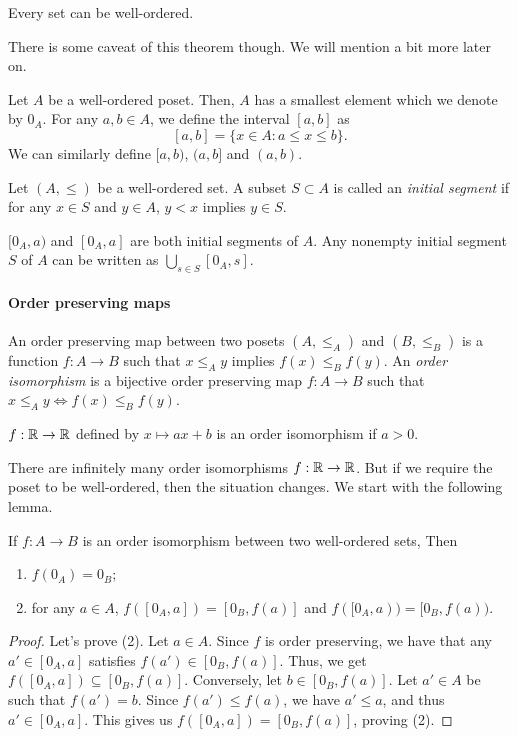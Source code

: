 \begin{theorem}
  Every set can be well-ordered.
\end{theorem}

There is some caveat of this theorem though. We will mention a bit more later on.

\begin{definition}
  Let $A$ be a well-ordered poset. Then, $A$ has a smallest element which we denote by $0_A$. For any $a,b\in A$, we define the interval $[a,b]$ as
  \[
  [a,b] = \{x\in A: a\leq x\leq b\}.
  \]
  We can similarly define $[a,b)$, $(a,b]$ and $(a,b)$.
\end{definition}

\begin{definition}
  Let $(A,\leq)$ be a well-ordered set. A subset $S\subset A$ is called an \emph{initial segment} if for any $x\in S$ and $y\in A$, $y<x$ implies $y\in S$. 
\end{definition}

\begin{example}
  $[0_A,a)$ and $[0_A,a]$ are both initial segments of $A$. Any nonempty initial segment $S$ of $A$ can be written as $\bigcup_{s\in S}[0_A,s]$.
\end{example}


\paragraph{Order preserving maps}
An order preserving map between two posets $(A,\le_A)$ and $(B,\le_B)$ is a function $f\colon A\to B$ such that $x\le_A y$ implies $f(x)\le_B f(y)$.  An \emph{order isomorphism} is a bijective order preserving map $f:A\to B$ such that $x\le_A y \iff f(x)\le_B f(y)$.

\begin{example}
  $f:\mathbb{R}\to \mathbb{R}$ defined by $x\mapsto ax+b$ is an order isomorphism if $a>0$.
\end{example}


There are infinitely many order isomorphisms $f:\mathbb{R}\to \mathbb{R}$. But if we require the poset to be well-ordered, then the situation changes. We start with the following lemma.

\begin{lemma}
  If $f:A\to B$ is an order isomorphism between two well-ordered sets, Then
  \begin{enumerate}
    \item $f(0_A)=0_B$;
    \item for any $a\in A$, $f([0_A,a])=[0_B,f(a)]$ and $f([0_A,a))=[0_B,f(a))$.
  \end{enumerate}
\end{lemma}
\begin{proof}
  Let's prove (2). Let $a\in A$. Since $f$ is order preserving, we have that any $a'\in [0_A,a]$ satisfies $f(a')\in [0_B,f(a)]$. Thus, we get $f([0_A,a])\subseteq [0_B,f(a)]$. Conversely, let $b\in [0_B,f(a)]$. Let $a'\in A$ be such that $f(a')=b$. Since $f(a')\leq f(a)$, we have $a'\leq a$, and thus $a'\in [0_A,a]$. This gives us $f([0_A,a])= [0_B,f(a)]$, proving (2).
\end{proof}

